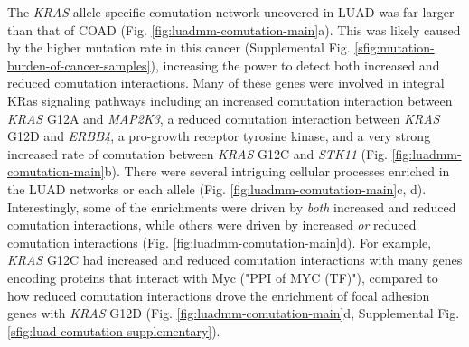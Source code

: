 \documentclass[english, 10pt, letterpaper]{article}
\newcommand{\KRAS}{\emph{KRAS}}
\newcommand{\kras}{KRas}
\begin{document}
The \KRAS{} allele-specific comutation network uncovered in LUAD was far larger than that of COAD (Fig. \ref{fig:luadmm-comutation-main}a).
This was likely caused by the higher mutation rate in this cancer (Supplemental Fig. \ref{sfig:mutation-burden-of-cancer-samples}), increasing the power to detect both increased and reduced comutation interactions.
Many of these genes were involved in integral \kras{} signaling pathways including an increased comutation interaction between \KRAS{} G12A and \emph{MAP2K3}, a reduced comutation interaction between \KRAS{} G12D and \emph{ERBB4}, a pro-growth receptor tyrosine kinase, and a very strong increased rate of comutation between \KRAS{} G12C and \emph{STK11} (Fig. \ref{fig:luadmm-comutation-main}b).
There were several intriguing cellular processes enriched in the LUAD networks or each allele (Fig. \ref{fig:luadmm-comutation-main}c, d).
Interestingly, some of the enrichments were driven by \emph{both} increased and reduced comutation interactions, while others were driven by increased \emph{or} reduced comutation interactions (Fig. \ref{fig:luadmm-comutation-main}d).
For example, \KRAS{} G12C had increased and reduced comutation interactions with many genes encoding proteins that interact with Myc ("PPI of MYC (TF)"), compared to how reduced comutation interactions drove the enrichment of focal adhesion genes with \KRAS{} G12D (Fig. \ref{fig:luadmm-comutation-main}d, Supplemental Fig. \ref{sfig:luad-comutation-supplementary}).
\end{document}
